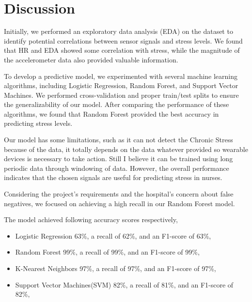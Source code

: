 \documentclass{article}
\begin{document}
\section{Discussion}

Initially, we performed an exploratory data analysis (EDA) on the dataset to identify potential correlations between sensor signals and stress levels. We found that HR and EDA showed some correlation with stress, while the magnitude of the accelerometer data also provided valuable information.

To develop a predictive model, we experimented with several machine learning algorithms, including Logistic Regression, Random Forest, and Support Vector Machines. We performed cross-validation and proper train/test splits to ensure the generalizability of our model. After comparing the performance of these algorithms, we found that Random Forest provided the best accuracy in predicting stress levels.\cite{stressmonitoring_iq3244}

Our model has some limitations, such as it can not detect the Chronic Stress because of the data, it totally depends on the data whatever provided so wearable devices is necessary to take action. Still I believe it can be trained using long periodic data through windowing of data. However, the overall performance indicates that the chosen signals are useful for predicting stress in nurses.

Considering the project's requirements and the hospital's concern about false negatives, we focused on achieving a high recall in our Random Forest model. 

The model achieved following accuracy scores respectively,

\begin{itemize}
\item Logistic Regression 63\%, a recall of 62\%, and an F1-score of 63\%, 
\item Random Forest 99\%, a recall of 99\%, and an F1-score of 99\%,
\item K-Nearest Neighbors 97\%, a recall of 97\%, and an F1-score of 97\%,
\item Support Vector Machines(SVM) 82\%, a recall of 81\%, and an F1-score of 82\%,
\end{itemize}
\end{document}
